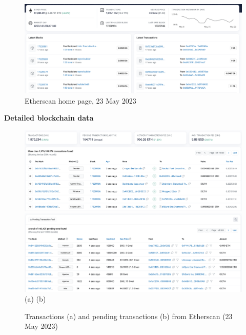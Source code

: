 \documentclass[UTF8]{article}
\begin{document}
\begin{figure}[htbp]
\begin{center}
\includegraphics[width=\linewidth]{images/etherscan}
\caption{Etherscan home page, 23 May 2023}
\label{fig:ethscan}
\end{center}
\end{figure}
\clearpage
\textbf{Detailed blockchain data}\\
\begin{figure}[htbp]
\begin{center}
\includegraphics[width=0.48\linewidth]{images/txns}
\includegraphics[width=0.48\linewidth]{images/pendtxns} \\
(a)\hspace{160pt}        (b)\\
\caption{Transactions (a) and pending transactions (b) from Etherscan (23 May 2023)}
\label{fig:txns}
\end{center}
\end{figure}
\end{document}
